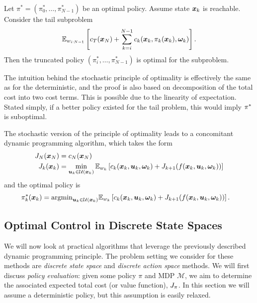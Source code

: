 \begin{theorem}
Let $\pi^* = (\pi_0^*, \ldots, \pi^*_{N-1})$ be an optimal policy. Assume state $\bm{x}_k$ is reachable. Consider the tail subproblem
\begin{equation}
\mathbb{E}_{w_{i:N-1}}\left[ c_T(\bm{x}_N) + \sum_{k=i}^{N-1} c_k(\bm{x}_k,\pi_k(\bm{x}_k),\bm{\omega}_k) \right].
\end{equation}
Then the truncated policy $(\pi_i^*, \ldots, \pi^*_{N-1})$ is optimal for the subproblem.
\end{theorem}
The intuition behind the stochastic principle of optimality is effectively the same as for the deterministic, and the proof is also based on decomposition of the total cost into two cost terms. This is possible due to the linearity of expectation. Stated simply, if a better policy existed for the tail problem, this would imply $\pi^*$ is suboptimal. 

The stochastic version of the principle of optimality leads to a concomitant dynamic programming algorithm, which takes the form
\begin{align}
    J_N(\bm{x}_N) &= c_N(\bm{x}_N)\\
    J_k(\bm{x}_k) &= \min_{\bm{u}_k \in \mathcal{U}(\bm{x}_k)} \mathbb{E}_{w_k} \left[ c_k(\bm{x}_k,\bm{u}_k,\bm{\omega}_k) + J_{k+1}(f(\bm{x}_k,\bm{u}_k,\bm{\omega}_k)) \right]
    \label{eq:DP_rec_stoch}
\end{align}
and the optimal policy is
\begin{align}
    \pi^*_k(\bm{x}_k) &= \text{argmin}_{\bm{u}_k \in \mathcal{U}(\bm{x}_k)} \mathbb{E}_{w_k} \left[ c_k(\bm{x}_k,\bm{u}_k,\bm{\omega}_k) + J_{k+1}(f(\bm{x}_k,\bm{u}_k,\bm{\omega}_k)) \right].
    \label{eq:DP_rec_stoch}
\end{align}


\subsection{Optimal Control in Discrete State Spaces}

We will now look at practical algorithms that leverage the previously described dynamic programming principle. The problem setting we consider for these methods are \textit{discrete state space} and \textit{discrete action space} methods. We will first discuss \textit{policy evaluation}: given some policy $\pi$ and MDP $\mathcal{M}$, we aim to determine the associated expected total cost (or value function), $J_{\pi}$. In this section we will assume a deterministic policy, but this assumption is easily relaxed.

